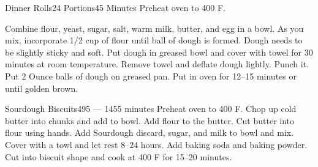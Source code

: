\documentclass[a4paper]{article}
\begin{document}
\begin{recipe}{Dinner Rolls}{24 Portions}{45 Minutes}
Preheat oven to 400\degrees{} F.

Combine flour, yeast, sugar, salt, warm milk, butter, and egg in a bowl.
As you mix, incorporate 1/2 cup of flour until ball of dough is formed.
Dough needs to be slightly sticky and soft. Put dough in greased bowl
and cover with towel for 30 minutes at room temperature. Remove towel
and deflate dough lightly. Punch it. Put 2 Ounce balls of dough on
greased pan. Put in oven for 12--15 minutes or until golden brown.
\end{recipe}

\begin{recipe}{Sourdough Biscuits}{}{495 --- 1455 minutes}
Preheat oven to 400\degrees{} F.
Chop up cold butter into chunks and add to bowl.
Add flour to the butter. Cut butter into flour using hands.
Add Sourdough discard, sugar, and milk to bowl and mix. Cover with a towl and let rest 8--24 hours.
Add baking soda and baking powder. Cut into biscuit shape and cook at 400\degrees{} F for 15--20 minutes.
\end{recipe}
\end{document}
